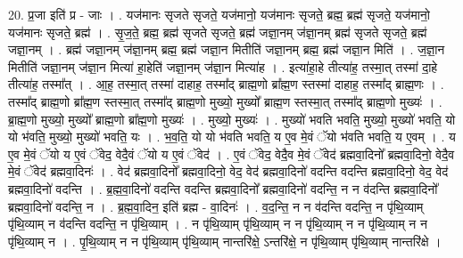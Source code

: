 \documentclass[17pt]{extarticle}
\begin{document}
20. प्र॒जा इति॑ प्र - जाः । . यज॑मानः सृजते सृजते॒ यज॑मानो॒ यज॑मानः सृजते॒ ब्रह्म॒ ब्रह्म॑ सृजते॒ यज॑मानो॒ यज॑मानः सृजते॒ ब्रह्म॑ । . सृ॒ज॒ते॒ ब्रह्म॒ ब्रह्म॑ सृजते सृजते॒ ब्रह्म॑ जज्ञा॒नम् ज॑ज्ञा॒नम् ब्रह्म॑ सृजते सृजते॒ ब्रह्म॑ जज्ञा॒नम् । . ब्रह्म॑ जज्ञा॒नम् ज॑ज्ञा॒नम् ब्रह्म॒ ब्रह्म॑ जज्ञा॒न मितीति॑ जज्ञा॒नम् ब्रह्म॒ ब्रह्म॑ जज्ञा॒न मिति॑ । . ज॒ज्ञा॒न मितीति॑ जज्ञा॒नम् ज॑ज्ञा॒न मित्या॑ हा॒हेति॑ जज्ञा॒नम् ज॑ज्ञा॒न मित्या॑ह । . इत्या॑हा॒हे तीत्या॑ह॒ तस्मा॒त् तस्मा॑ दा॒हे तीत्या॑ह॒ तस्मा᳚त् । . आ॒ह॒ तस्मा॒त् तस्मा॑ दाहाह॒ तस्मा᳚द् ब्राह्म॒णो ब्रा᳚ह्म॒ण स्तस्मा॑ दाहाह॒ तस्मा᳚द् ब्राह्म॒णः । . तस्मा᳚द् ब्राह्म॒णो ब्रा᳚ह्म॒ण स्तस्मा॒त् तस्मा᳚द् ब्राह्म॒णो मुख्यो॒ मुख्यो᳚ ब्राह्म॒ण स्तस्मा॒त् तस्मा᳚द् ब्राह्म॒णो मुख्यः॑ । . ब्रा॒ह्म॒णो मुख्यो॒ मुख्यो᳚ ब्राह्म॒णो ब्रा᳚ह्म॒णो मुख्यः॑ । . मुख्यो॒ मुख्यः॑ । . मुख्यो॑ भवति भवति॒ मुख्यो॒ मुख्यो॑ भवति॒ यो यो भ॑वति॒ मुख्यो॒ मुख्यो॑ भवति॒ यः । . भ॒व॒ति॒ यो यो भ॑वति भवति॒ य ए॒व मे॒वं ॅयो भ॑वति भवति॒ य ए॒वम् । . य ए॒व मे॒वं ॅयो य ए॒वं ॅवेद॒ वेदै॒वं ॅयो य ए॒वं ॅवेद॑ । . ए॒वं ॅवेद॒ वेदै॒व मे॒वं ॅवेद॑ ब्रह्मवा॒दिनो᳚ ब्रह्मवा॒दिनो॒ वेदै॒व मे॒वं ॅवेद॑ ब्रह्मवा॒दिनः॑ । . वेद॑ ब्रह्मवा॒दिनो᳚ ब्रह्मवा॒दिनो॒ वेद॒ वेद॑ ब्रह्मवा॒दिनो॑ वदन्ति वदन्ति ब्रह्मवा॒दिनो॒ वेद॒ वेद॑ ब्रह्मवा॒दिनो॑ वदन्ति । . ब्र॒ह्म॒वा॒दिनो॑ वदन्ति वदन्ति ब्रह्मवा॒दिनो᳚ ब्रह्मवा॒दिनो॑ वदन्ति॒ न न व॑दन्ति ब्रह्मवा॒दिनो᳚ ब्रह्मवा॒दिनो॑ वदन्ति॒ न । . ब्र॒ह्म॒वा॒दिन॒ इति॑ ब्रह्म - वा॒दिनः॑ । . व॒द॒न्ति॒ न न व॑दन्ति वदन्ति॒ न पृ॑थि॒व्याम् पृ॑थि॒व्याम् न व॑दन्ति वदन्ति॒ न पृ॑थि॒व्याम् । . न पृ॑थि॒व्याम् पृ॑थि॒व्याम् न न पृ॑थि॒व्याम् न न पृ॑थि॒व्याम् न न पृ॑थि॒व्याम् न । . पृ॒थि॒व्याम् न न पृ॑थि॒व्याम् पृ॑थि॒व्याम् नान्तरि॑क्षे॒ ऽन्तरि॑क्षे॒ न पृ॑थि॒व्याम् पृ॑थि॒व्याम् नान्तरि॑क्षे । \newline
\end{document}
